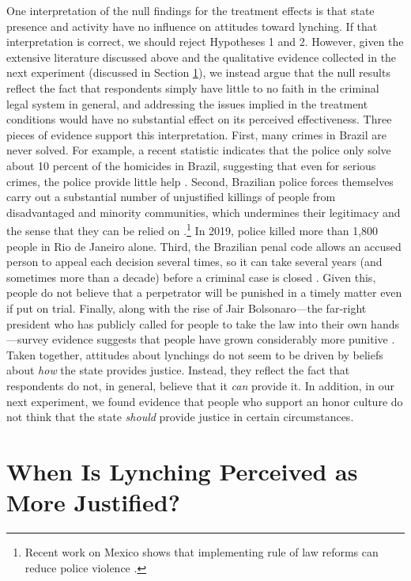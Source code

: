 \documentclass[12pt,ansiapaper]{article}
\begin{document}
One interpretation of the null findings for the treatment effects is that state presence and activity have no influence on attitudes toward lynching. If that interpretation is correct, we should reject Hypotheses 1 and 2. However, given the extensive literature discussed above and the qualitative evidence collected in the next experiment (discussed in Section \ref{sec:exp01}), we instead argue that the null results reflect the fact that respondents simply have little to no faith in the criminal legal system in general, and addressing the issues implied in the treatment conditions would have no substantial effect on its perceived effectiveness. Three pieces of evidence support this interpretation. First, many crimes in Brazil are never solved. For example, a recent statistic indicates that the police only solve about 10 percent of the homicides in Brazil, suggesting that even for serious crimes, the police provide little help \citep{pearson2018latam}. Second, Brazilian police forces themselves carry out a substantial number of unjustified killings of people from disadvantaged and minority communities, which undermines their legitimacy and the sense that they can be relied on \citep{willis2015killing}.\footnote{Recent work on Mexico shows that implementing rule of law reforms can reduce police violence \citep{magaloni2020institutionalized}.} In 2019, police killed more than 1,800 people in Rio de Janeiro alone. Third, the Brazilian penal code allows an accused person to appeal each decision several times, so it can take several years (and sometimes more than a decade) before a criminal case is closed \citep{sousa2005utilizaccao}. Given this, people do not believe that a perpetrator will be punished in a timely matter even if put on trial. Finally, along with the rise of Jair Bolsonaro---the far-right president who has publicly called for people to take the law into their own hands \citep{brant2021armas, uol2021bolsonaro}---survey evidence suggests that people have grown considerably more punitive \citep{datafolha2018penademorte}. Taken together, attitudes about lynchings do not seem to be driven by beliefs about \textit{how} the state provides justice. Instead, they reflect the fact that respondents do not, in general, believe that it \textit{can} provide it. In addition, in our next experiment, we found evidence that people who support an honor culture do not think that the state \textit{should} provide justice in certain circumstances. 

\section{When Is Lynching Perceived as More Justified?}
\label{sec:exp01}
\end{document}
